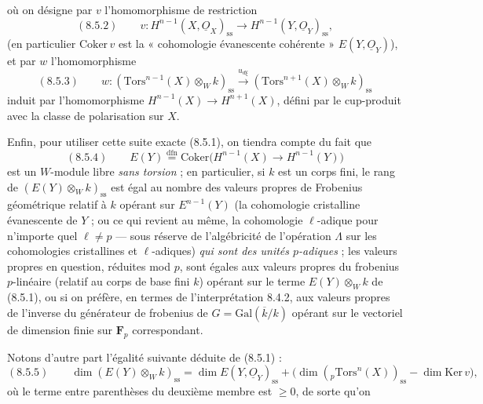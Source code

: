 \documentclass[11pt,a4paper]{article}
\begin{document}
où on désigne par $v$ l'homomorphisme de restriction
\[
(8.5.2) \qquad v : H^{n-1}(X, \underline{O}_{X})_{\mathrm{ss}} \to
H^{n-1}(Y, \underline{O}_{Y})_{\mathrm{ss}} ,
\]
(en particulier $\mathrm{Coker}\, v$ est la « cohomologie évanescente
cohérente » $E(Y, \underline{O}_{Y})$), et par $w$ l'homomorphisme
\[
(8.5.3) \qquad w : (\mathrm{Tors}^{n-1}(X) \otimes_{W} k)_{\mathrm{ss}}
\xrightarrow{u_{d\xi}} (\mathrm{Tors}^{n+1}(X) \otimes_{W} k)_{\mathrm{ss}}
\]
induit par l'homomorphisme $H^{n-1}(X) \to H^{n+1}(X)$, défini par le cup-produit
avec la classe de polarisation  sur $X$.


Enfin, pour utiliser cette suite exacte (8.5.1), on tiendra compte du fait que
\[
(8.5.4) \qquad E(Y) \overset{\mathrm{dfn}}{=}
\mathrm{Coker}\bigl(H^{n-1}(X) \to H^{n-1}(Y)\bigr)
\]
est un $W$-module libre \emph{sans torsion} ; en particulier, si $k$ est un
corps fini, le rang de $(E(Y) \otimes_{W} k)_{\mathrm{ss}}$ est égal au nombre
des valeurs propres de Frobenius géométrique relatif à $k$ opérant sur $E^{n-1}(Y)$
(la cohomologie cristalline évanescente de $Y$ ; ou ce qui revient au même, la
cohomologie $\ell$-adique pour n'importe quel $\ell \neq p$ --- sous réserve
de l'algébricité de l'opération $\Lambda$ sur les cohomologies cristallines et
$\ell$-adiques) \emph{qui sont des unités $p$-adiques} ; les valeurs propres en
question, réduites mod $p$, sont égales aux valeurs propres du frobenius
$p$-linéaire (relatif au corps de base fini $k$) opérant sur le terme
$E(Y) \otimes_{W} k$ de (8.5.1), ou si on préfère, en termes de
l'interprétation 8.4.2, aux valeurs propres de l'inverse du générateur de
frobenius de $G = \mathrm{Gal}(\overline{k}/k)$ opérant sur le vectoriel de
dimension finie sur $\mathbf{F}_{p}$ correspondant.

Notons d'autre part l'égalité suivante déduite de (8.5.1) :
\[
(8.5.5) \qquad \dim (E(Y) \otimes_{W} k)_{\mathrm{ss}} =
\dim E(Y, \underline{O}_{Y})_{\mathrm{ss}} +
\bigl(\dim ({}_{p}\mathrm{Tors}^{n}(X))_{\mathrm{ss}}
- \dim \mathrm{Ker}\, v\bigr) ,
\]
où le terme entre parenthèses du deuxième membre est $\geq 0$, de sorte
qu'on
\end{document}
